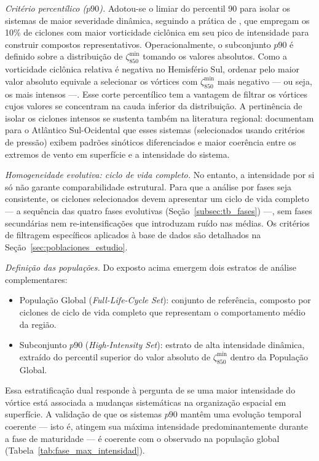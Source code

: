 \textit{Critério percentílico ($p90$).}
Adotou-se o limiar do percentil 90 para isolar os sistemas de maior severidade dinâmica, seguindo a prática de \citet{priestley2022improved}, que empregam os 10\% de ciclones com maior vorticidade ciclônica em seu pico de intensidade para construir compostos representativos.
Operacionalmente, o subconjunto $p90$ é definido sobre a distribuição de $\zeta_{850}^{\min}$ tomando os valores absolutos. Como a vorticidade ciclônica relativa é negativa no Hemisfério Sul, ordenar pelo maior valor absoluto equivale a selecionar os vórtices com $\zeta_{850}^{\min}$ mais negativo — ou seja, os mais intensos —.
Esse corte percentílico tem a vantagem de filtrar os vórtices cujos valores se concentram na cauda inferior da distribuição.
A pertinência de isolar os ciclones intensos se sustenta também na literatura regional: \citet{andrade2024composite} documentam para o Atlântico Sul-Ocidental que esses sistemas (selecionados usando critérios de pressão) exibem padrões sinóticos diferenciados e maior coerência entre os extremos de vento em superfície e a intensidade do sistema.

\textit{Homogeneidade evolutiva: ciclo de vida completo.} No entanto, a intensidade por si só não garante comparabilidade estrutural.
Para que a análise por fases seja consistente, os ciclones selecionados devem apresentar um ciclo de vida completo — a sequência das quatro fases evolutivas (Seção~\ref{subsec:tb_fases}) —, sem fases secundárias nem re-intensificações que introduzam ruído nas médias.
Os critérios de filtragem específicos aplicados à base de dados são detalhados na Seção~\ref{sec:poblaciones_estudio}.

\textit{Definição das populações.} Do exposto acima emergem dois estratos de análise complementares:

\begin{itemize}
    \item População Global (\textit{Full-Life-Cycle Set}): conjunto de referência, composto por ciclones de ciclo de vida completo que representam o comportamento médio da região.
    \item Subconjunto $p90$ (\textit{High-Intensity Set}): estrato de alta intensidade dinâmica, extraído do percentil superior do valor absoluto de $\zeta_{850}^{\min}$ dentro da População Global.
\end{itemize}

Essa estratificação dual responde à pergunta de se uma maior intensidade do vórtice está associada a mudanças sistemáticas na organização espacial em superfície.
A validação de que os sistemas $p90$ mantêm uma evolução temporal coerente — isto é, atingem sua máxima intensidade predominantemente durante a fase de maturidade — é coerente com o observado na população global (Tabela~\ref{tab:fase_max_intensidad}).

